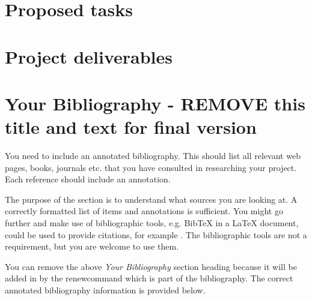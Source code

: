\documentclass[11pt,fleqn,twoside]{article}
\begin{document}
\section{Proposed tasks}


\section{Project deliverables}

%
%
\section*{Your Bibliography - REMOVE this title and text for final version}
%
You need to include an annotated bibliography. This should list all relevant web pages, books, journals etc. that you have consulted in researching your project. Each reference should include an annotation. 

The purpose of the section is to understand what sources you are looking at.  A correctly formatted list of items and annotations is sufficient. You might go further and make use of bibliographic tools, e.g. BibTeX in a LaTeX document, could be used to provide citations, for example \cite{NumericalRecipes} \cite{MarksPaper} \cite[99-101]{FailBlog} \cite{kittenpic_ref}.  The bibliographic tools are not a requirement, but you are welcome to use them.   

You can remove the above {\em Your Bibliography} section heading because it will be added in by the renewcommand which is part of the bibliography. The correct annotated bibliography information is provided below. 
%
%


\nocite{*} %
\end{document}
